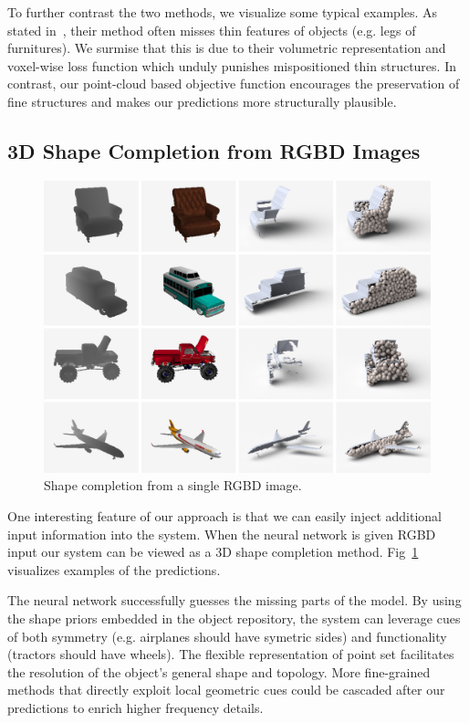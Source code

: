 To further contrast the two methods, we visualize some typical examples. As stated in~\cite{choy20163d}, their method often misses thin features of objects (e.g. legs of furnitures). We surmise that this is due to their volumetric representation and voxel-wise loss function which unduly punishes mispositioned thin structures. In contrast, our point-cloud based objective function encourages the preservation of fine structures and makes our predictions more structurally plausible.

\subsection{3D Shape Completion from RGBD Images}
\label{sec:exp:depth}
\begin{figure}[th!]
  \centering
  \includegraphics[width=0.9\linewidth]{./fig/completion}
  \caption{Shape completion from a single RGBD image.}\label{fig:shape_completion}
\end{figure}
One interesting feature of our approach is that we can easily inject additional input information into the system. When the neural network is given RGBD input our system can be viewed as a 3D shape completion method. Fig~\ref{fig:shape_completion} visualizes examples of the predictions.

The neural network successfully guesses the missing parts of the model. By using the shape priors embedded in the object repository, the system can leverage cues of both symmetry (e.g. airplanes should have symetric sides) and functionality (tractors should have wheels). The flexible representation of point set facilitates the resolution of the object's general shape and topology. More fine-grained methods that directly exploit local geometric cues could be cascaded after our predictions to enrich higher frequency details.

